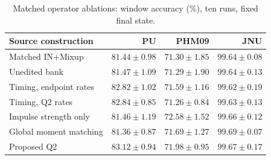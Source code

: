 \begin{table}[pos=htbp]
\centering\small
\caption{Matched operator ablations: window accuracy (\%), ten runs, fixed final state.}
\label{tab:ablation}
\begin{tabular}{lrrr}
\toprule
Source construction & PU & PHM09 & JNU\\
\midrule
Matched IN+Mixup & $81.44\pm0.98$ & $71.30\pm1.85$ & $99.64\pm0.08$\\
Unedited bank & $81.47\pm1.09$ & $71.29\pm1.90$ & $99.64\pm0.13$\\
Timing, endpoint rates & $82.82\pm1.02$ & $71.59\pm1.16$ & $99.62\pm0.19$\\
Timing, Q2 rates & $82.84\pm0.85$ & $71.26\pm0.84$ & $99.63\pm0.13$\\
Impulse strength only & $81.46\pm1.19$ & $72.58\pm1.52$ & $99.66\pm0.12$\\
Global moment matching & $81.36\pm0.87$ & $71.69\pm1.27$ & $99.69\pm0.07$\\
Proposed Q2 & $83.12\pm0.94$ & $71.98\pm0.95$ & $99.67\pm0.17$\\
\bottomrule
\end{tabular}
\end{table}
